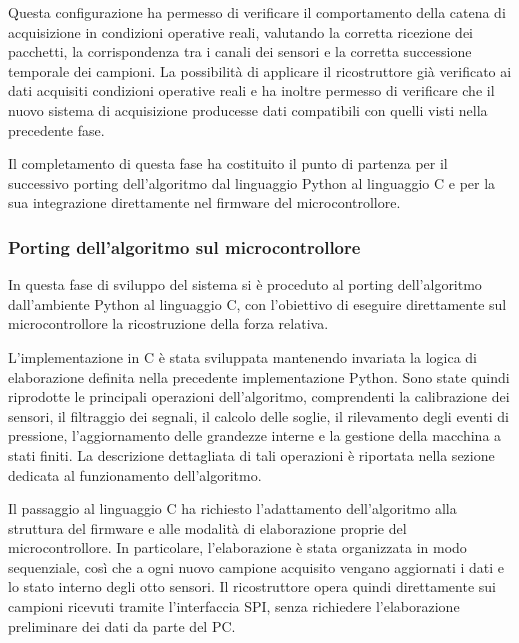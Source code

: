 \documentclass[10pt, a4paper]{article}
\begin{document}
                Questa configurazione ha permesso di verificare il comportamento della catena di acquisizione in condizioni operative reali, valutando 
                la corretta ricezione dei pacchetti, la corrispondenza tra i canali dei sensori e la corretta successione temporale dei campioni. La possibilità 
                di applicare il ricostruttore già verificato ai dati acquisiti condizioni operative reali e ha inoltre permesso di verificare che il nuovo sistema di 
                acquisizione producesse dati compatibili con quelli visti nella precedente fase.

                Il completamento di questa fase ha costituito il punto di partenza per il successivo porting dell'algoritmo dal linguaggio Python al linguaggio 
                C e per la sua integrazione direttamente nel firmware del microcontrollore.

            \subsubsection{Porting dell'algoritmo sul microcontrollore}
                In questa fase di sviluppo del sistema si è proceduto al porting dell'algoritmo
                dall'ambiente Python al linguaggio C, con l'obiettivo di eseguire direttamente sul microcontrollore la ricostruzione della forza relativa.

                L'implementazione in C è stata sviluppata mantenendo invariata la logica di elaborazione definita nella precedente implementazione Python. Sono 
                state quindi riprodotte le principali operazioni dell'algoritmo, comprendenti la calibrazione dei sensori, il filtraggio dei segnali, 
                il calcolo delle soglie, il rilevamento degli eventi di pressione, l'aggiornamento delle grandezze interne e la gestione della macchina a stati finiti. 
                La descrizione dettagliata di tali operazioni è riportata nella sezione dedicata al funzionamento dell'algoritmo.

                Il passaggio al linguaggio C ha richiesto l'adattamento dell'algoritmo alla struttura del firmware e alle modalità di elaborazione proprie del microcontrollore. 
                In particolare, l'elaborazione è stata organizzata in modo sequenziale, così che a ogni nuovo campione acquisito vengano aggiornati i dati e lo 
                stato interno degli otto sensori. Il ricostruttore opera quindi direttamente sui campioni ricevuti tramite l'interfaccia SPI, senza richiedere 
                l'elaborazione preliminare dei dati da parte del PC.
\end{document}

